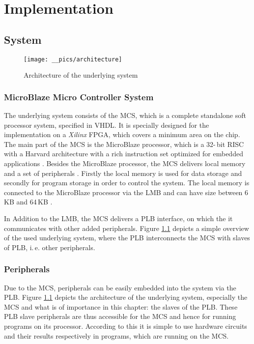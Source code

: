 
\chapter{Implementation}
\label{ch:implementation}

\section{System}
\label{sec:system}

\begin{figure}[h]
		\texttt{[image: \_\_pics/architecture]}
		\caption{Architecture of the underlying system}
		\label{pic:architecture}	
	\end{figure} 
	
\subsection{MicroBlaze Micro Controller System}
The underlying system consists of the \ac{MCS}, which is a complete standalone soft processor system, specified in \ac{VHDL}. It is specially designed for the implementation on a \textit{Xilinx} \ac{FPGA}, which covers a minimum area on the chip. The main part of the \ac{MCS} is the MicroBlaze processor, which is a 32-\,bit \ac{RISC} with a Harvard architecture with a rich instruction set optimized for embedded applications \cite{Xilinxa}. Besides the MicroBlaze processor, the \ac{MCS} delivers local memory and a set of peripherals \cite{Xilinx2012}. Firstly the local memory is used for data storage and secondly for program storage in order to control the system. The local memory is connected to the MicroBlaze processor via the \ac{LMB} and can have size between 6\,KB and 64\,KB \cite{Xilinx2012}.

In Addition to the \ac{LMB}, the \ac{MCS} delivers a \ac{PLB} interface, on which the it communicates with other added peripherals. Figure \ref{pic:architecture} depicts a simple overview of the used underlying system, where the \ac{PLB} interconnects the \ac{MCS} with slaves of \ac{PLB}, i.\,e. other peripherals.

\subsection{Peripherals}

Due to the \ac{MCS}, peripherals can be easily embedded into the system via the \ac{PLB}. Figure \ref{pic:architecture} depicts the architecture of the underlying system, especially the \ac{MCS} and what is of importance in this chapter: the slaves of the \ac{PLB}. These \ac{PLB} slave peripherals are thus accessible for the \ac{MCS} and hence for running programs on its processor. According to this it is simple to use hardware circuits and their results respectively in programs, which are running on the \ac{MCS}.

